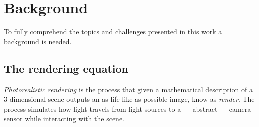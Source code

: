 \section{Background}

To fully comprehend the topics and challenges presented in this work a background is needed.

\subsection{The rendering equation}
\textit{Photorealistic rendering} is the process that given a mathematical description of a 3-dimensional scene outputs an as life-like as possible image, know as \textit{render}. The process simulates how light travels from light sources to a --- abstract --- camera sensor while interacting with the scene.
